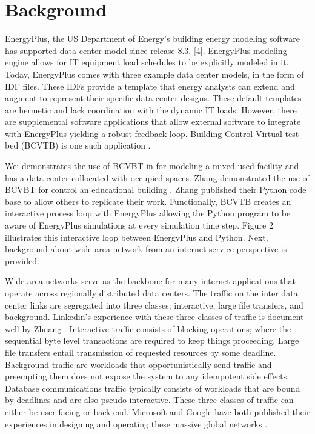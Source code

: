 \section{Background}
    EnergyPlus, the US Department of Energy’s building energy modeling software has supported data center model since release 8.3. [4]. EnergyPlus modeling engine allows for IT equipment load schedules to be explicitly modeled in it. Today, EnergyPlus comes with three example data center models, in the form of IDF files. These IDFs provide a template that energy analysts can extend and augment to represent their specific data center designs. These default templates are hermetic and lack coordination with the dynamic IT loads. However, there are supplemental software applications that allow external software to integrate with EnergyPlus yielding a robust feedback loop. Building Control Virtual test bed (BCVTB) is one such application \cite{EnergyPlus8.3}. 
    
    
    
    Wei demonstrates the use of BCVBT in \cite{wei17} for modeling a mixed used facility and has a data center collocated with occupied spaces. Zhang demonstrated the use of BCVBT for control an educational building \cite{zhang19}. Zhang published their Python code base to allow others to replicate their work. Functionally, BCVTB creates an interactive process loop with EnergyPlus allowing the Python program to be aware of EnergyPlus simulations at every simulation time step. Figure 2 illustrates this interactive loop between EnergyPlus and Python. Next, background about wide area network from an internet service perspective is provided. 
    
    Wide area networks serve as the backbone for many internet applications that operate across regionally distributed data centers. The traffic on the inter data center links are segregated into three classes; interactive, large file transfers, and background. Linkedin’s experience with these three classes of traffic is document well by Zhuang \cite{zhuang15}. Interactive traffic consists of blocking operations; where the sequential byte level transactions are required to keep things proceeding. Large file transfers entail transmission of requested resources by some deadline. Background traffic are workloads that opportunistically send traffic and preempting them does not expose the system to any idempotent side effects. Database communications traffic typically consists of workloads that are bound by deadlines and are also pseudo-interactive. These three classes of traffic can either be user facing or back-end. Microsoft and Google have both published their experiences in designing and operating these massive global networks \cite{hong13, sushant13}.  


